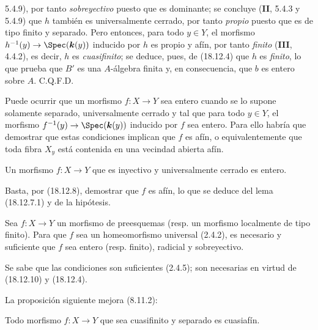 
5.4.9), por tanto \emph{sobreyectivo} puesto que es dominante; se concluye (\textbf{II}, 5.4.3 y 5.4.9) que $h$ también es universalmente cerrado, por tanto \emph{propio} puesto que es de tipo finito y separado. Pero entonces, para todo $y\in Y$, el morfismo $h^{-1}(y)\to\Spec(\boldsymbol{k}(y))$ inducido por $h$ es propio y afín, por tanto \emph{finito} (\textbf{III}, 4.4.2), es decir, $h$ es \emph{cuasifinito}; se deduce, pues, de (18.12.4) que $h$ es \emph{finito}, lo que prueba que $B'$ es una $A$-álgebra finita y, en consecuencia, que $b$ es entero sobre $A$. C.Q.F.D.

\begin{remark}[18.12.9]
\label{IV.18.12.9}
Puede ocurrir que un morfismo $f:X\to Y$ sea entero cuando se lo supone solamente separado, universalmente cerrado y tal que para todo $y\in Y$, el morfismo $f^{-1}(y)\to\Spec(\boldsymbol{k}(y))$ inducido por $f$ sea entero. Para ello habría que demostrar que estas condiciones implican que $f$ es afín, o equivalentemente que toda fibra $X_y$ está contenida en una vecindad abierta afín.
\end{remark}

\begin{corollary}[18.12.10]
\label{IV.18.12.10}
Un morfismo $f:X\to Y$ que es inyectivo y universalmente cerrado es entero.
\end{corollary}

Basta, por (18.12.8), demostrar que $f$ es afín, lo que se deduce del lema (18.12.7.1) y de la hipótesis.

\begin{corollary}[18.12.11]
\label{IV.18.12.11}
Sea $f:X\to Y$ un morfismo de preesquemas \textup{(resp.} un morfismo localmente de tipo finito\textup{)}. Para que $f$ sea un homeomorfismo universal \textup{(2.4.2)}, es necesario y suficiente que $f$ sea entero \textup{(resp.} finito\textup{)}, radicial y sobreyectivo.
\end{corollary}

Se sabe que las condiciones son suficientes (2.4.5); son necesarias en virtud de (18.12.10) y (18.12.4).

La proposición siguiente mejora (8.11.2):

\begin{proposition}[18.12.12]
\label{IV.18.12.12}
Todo morfismo $f:X\to Y$ que sea cuasifinito y separado es cuasiafín.
\end{proposition}

